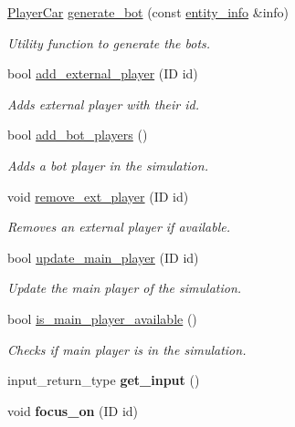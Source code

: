\begin{DoxyCompactItemize}
\hyperlink{classcp_1_1_player_car}{Player\+Car} \hyperlink{classcp_1_1_game_simulator_ae0a0e21217dfffba34e067ebc77c9031}{generate\+\_\+bot} (const \hyperlink{classcp_1_1entity__info}{entity\+\_\+info} \&info)
\begin{DoxyCompactList}\small\item\em Utility function to generate the bots. \end{DoxyCompactList}\item 
bool \hyperlink{classcp_1_1_game_simulator_addf94d6211247e0f2c77cae8541f09d8}{add\+\_\+external\+\_\+player} (ID id)
\begin{DoxyCompactList}\small\item\em Adds external player with their id. \end{DoxyCompactList}\item 
bool \hyperlink{classcp_1_1_game_simulator_ae06e0ba47d8d535f462c072daaae16e4}{add\+\_\+bot\+\_\+players} ()
\begin{DoxyCompactList}\small\item\em Adds a bot player in the simulation. \end{DoxyCompactList}\item 
void \hyperlink{classcp_1_1_game_simulator_a5f2d1089b8a260f62138d6f07ba404a7}{remove\+\_\+ext\+\_\+player} (ID id)
\begin{DoxyCompactList}\small\item\em Removes an external player if available. \end{DoxyCompactList}\item 
bool \hyperlink{classcp_1_1_game_simulator_a04e844bdf85698a60c978d173116e1e0}{update\+\_\+main\+\_\+player} (ID id)
\begin{DoxyCompactList}\small\item\em Update the main player of the simulation. \end{DoxyCompactList}\item 
bool \hyperlink{classcp_1_1_game_simulator_aafaedf9736a754a59b8a4c35db3fdac3}{is\+\_\+main\+\_\+player\+\_\+available} ()
\begin{DoxyCompactList}\small\item\em Checks if main player is in the simulation. \end{DoxyCompactList}\item 
\mbox{\label{classcp_1_1_game_simulator_a54d498d40cb2d615039d8d03dfc76239}} 
input\+\_\+return\+\_\+type {\bfseries get\+\_\+input} ()
\item 
\mbox{\label{classcp_1_1_game_simulator_a31162ab043dad3357cb7f6cda7861618}} 
void {\bfseries focus\+\_\+on} (ID id)
\end{DoxyCompactItemize}

